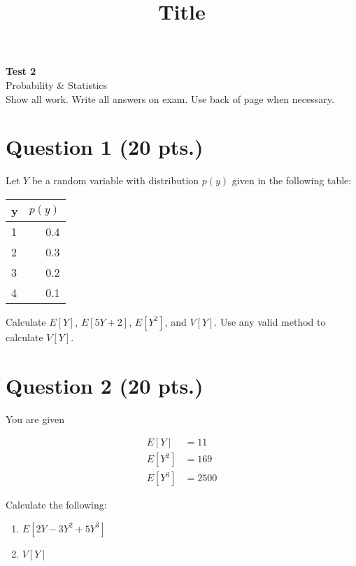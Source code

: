 \documentclass[11pt]{article}
\theoremstyle{definition}
\begin{document}
\title{Title}

\thispagestyle{empty}

\begin{center}
{\LARGE \bf Test 2} \\
{\large Probability \& Statistics} \\
{\large Show all work. Write all answers on exam. Use back of page when necessary. } \\
\end{center}
\section*{Question 1 (20 pts.)}

Let $Y$ be a random variable with distribution $p(y)$ given in the following table:

\begin{table}[h]
	\centering
	\begin{tabular}{lr}
		\hline
		y & $p(y)$ \\
		\hline
		1 & 0.4 \\
		2 & 0.3 \\
		3 & 0.2 \\
		4 & 0.1 \\
		\hline
	\end{tabular}
\end{table}

\noindent Calculate $E[Y]$, $E[5Y+2]$, $E\left[ Y^2 \right]$, and $V[Y]$. Use any valid method to calculate $V[Y]$.

\newpage

\section*{Question 2 (20 pts.)}

You are given

$$
	\begin{aligned}
		E[Y] & = 11 \\
		E[Y^2] & = 169 \\
		E[Y^3] & = 2500
	\end{aligned}
$$

\noindent Calculate the following:

\begin{enumerate}
	\item $E[2Y - 3Y^2 + 5Y^3]$
	\item $V[Y]$
\end{enumerate}

\newpage
\end{document}
